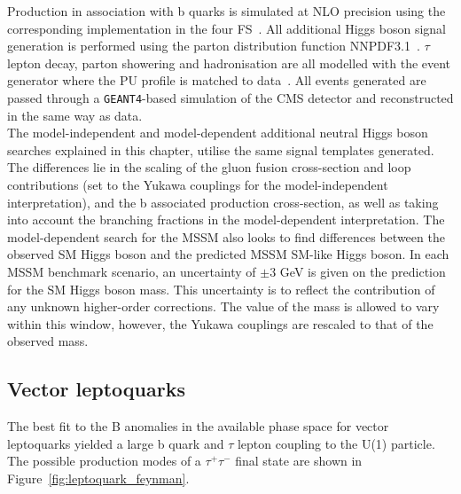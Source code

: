 Production in association with b quarks is simulated at \ac{NLO} precision using the corresponding  implementation in the four \ac{FS}~\cite{Nason:2004rx,Frixione:2007vw,Alioli:2010xd,Jezo:2015aia}.
All additional Higgs boson signal generation is performed using the parton distribution function NNPDF3.1~\cite{Ball:2014uwa,Ball:2017nwa}.
$\tau$ lepton decay, parton showering and hadronisation are all modelled with the \PYTHIA event generator where the \ac{PU} profile is matched to data~\cite{Sirunyan:2019dfx,Sjostrand:2014zea}.
All events generated are passed through a \texttt{GEANT4}-based \cite{Agostinelli:2002hh} simulation of the \ac{CMS} detector and reconstructed in the same way as data. \\

The model-independent and model-dependent additional neutral Higgs boson searches explained in this chapter, utilise the same signal templates generated. 
The differences lie in the scaling of the gluon fusion cross-section and loop contributions (set to the Yukawa couplings for the model-independent interpretation), and the b associated production cross-section, as well as taking into account the branching fractions in the model-dependent interpretation.
The model-dependent search for the \ac{MSSM} also looks to find differences between the observed \ac{SM} Higgs boson and the predicted \ac{MSSM} \ac{SM}-like Higgs boson.
In each \ac{MSSM} benchmark scenario, an uncertainty of $\pm 3$ GeV is given on the prediction for the \ac{SM} Higgs boson mass.
This uncertainty is to reflect the contribution of any unknown higher-order corrections.
The value of the mass is allowed to vary within this window, however, the Yukawa couplings are rescaled to that of the observed mass.

\subsection{Vector leptoquarks}
\label{sec:vlq}

The best fit to the B anomalies in the available phase space for vector leptoquarks yielded a large b quark and $\tau$ lepton coupling to the U(1) particle.
The possible production modes of a $\tau^+\tau^-$ final state are shown in Figure~\ref{fig:leptoquark_feynman}. \\

